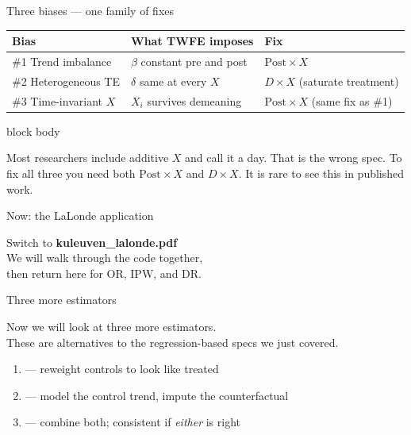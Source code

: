 \documentclass[aspectratio=169,11pt]{beamer}
\newcommand{\emphbox}[1]{%
  \begin{beamercolorbox}[rounded=true,sep=7pt,wd=\linewidth]{block body}%
    \small\color{slate}\raggedright #1%
  \end{beamercolorbox}}
\begin{document}

\begin{frame}{Three biases --- one family of fixes}
\vspace{0.3em}
{\small
\begin{tabular}{@{}lll@{}}
\toprule
\textbf{Bias} & \textbf{What TWFE imposes} & \textbf{Fix} \\
\midrule
\#1 Trend imbalance
  & $\beta$ constant pre and post
  & $\mathrm{Post}\times X$ \\[4pt]
\#2 Heterogeneous TE
  & $\delta$ same at every $X$
  & $D\times X$ (saturate treatment) \\[4pt]
\#3 Time-invariant $X$
  & $X_i$ survives demeaning
  & $\mathrm{Post}\times X$ (same fix as \#1) \\
\bottomrule
\end{tabular}
}
\vspace{0.5em}
\emphbox{Most researchers include additive $X$ and call it a day. That is the wrong spec.
To fix all three you need both $\mathrm{Post}\times X$ and $D\times X$.
It is rare to see this in published work.}
\end{frame}

\begin{frame}{Now: the LaLonde application}
\vspace{1.2em}
\begin{center}
\Large
Switch to \textbf{kuleuven\_lalonde.pdf}\\[0.8em]
\color{warmgray}\normalsize
We will walk through the code together,\\
then return here for OR, IPW, and DR.
\end{center}
\end{frame}


\begin{frame}{Three more estimators}
\vspace{0.8em}
\begin{center}
Now we will look at three more estimators.\\[0.5em]
These are alternatives to the regression-based specs we just covered.
\end{center}
\vspace{0.6em}
\begin{enumerate}\setlength\itemsep{0.5em}
  \item {} --- reweight controls to look like treated
  \item {} --- model the control trend, impute the counterfactual
  \item {} --- combine both; consistent if \textit{either} is right
\end{enumerate}
\end{frame}
\end{document}
